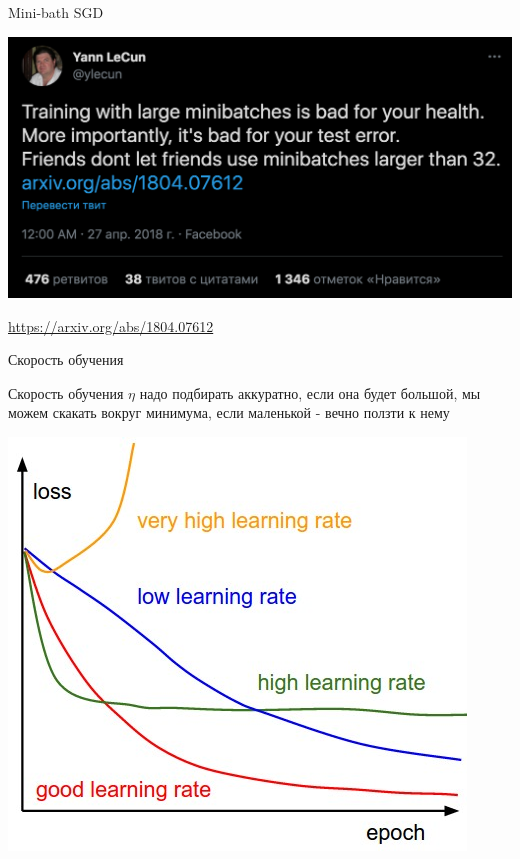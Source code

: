 \documentclass[notes,12pt, aspectratio=169]{beamer}
\newenvironment{wideitemize}{\itemize\addtolength{\itemsep}{10pt}}{\enditemize}
\begin{document}
\begin{frame}{Mini-bath SGD}
\begin{center}
	\includegraphics[width=0.8\paperwidth]{lec_meme.png}
\end{center}
\vfill %
\footnotesize 
\color{blue} \url{https://arxiv.org/abs/1804.07612}
\end{frame}


\begin{frame}{Скорость обучения}
\begin{wideitemize}
	\item Скорость обучения $\eta$ надо подбирать аккуратно, если она будет большой, мы можем скакать вокруг минимума, если маленькой - вечно ползти к нему
	
	\begin{center}
		\includegraphics[width=0.4\paperwidth]{learningrates.jpg}
	\end{center}
\end{wideitemize}
\end{frame}
\end{document}

